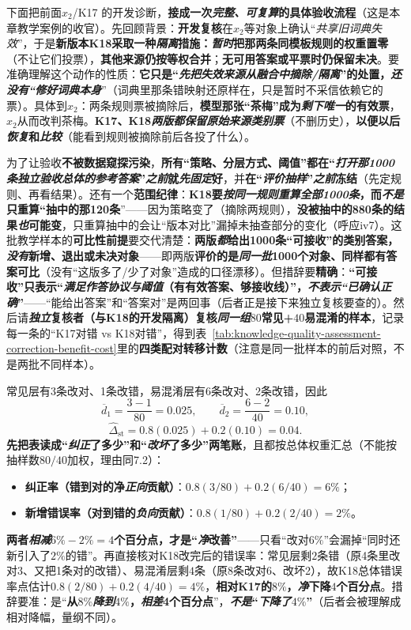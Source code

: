 下面把前面$x_2$/K17 的开发诊断，\textbf{接成一次\emph{完整、可复算}的具体验收流程}（这是本章教学案例的收官）。先回顾背景：\textbf{开发复核}在$x_2$等对象上确认“\emph{共享旧词典失效}”，于是\textbf{新版本K18采取一种\emph{隔离}措施：\emph{暂时}把那两条同模板规则的权重置零}（不让它们投票），\textbf{其他来源仍按等权合并}；\textbf{无可用答案或平票时仍保留未决}。要准确理解这个动作的性质：\textbf{它只是“\emph{先把\emph{失效来源}从融合中\emph{摘除/隔离}}”的处置，\emph{还\emph{没有}“修好词典本身}}”（词典里那条错映射还原样在，只是暂时不采信依赖它的票）。具体到$x_2$：两条规则票被摘除后，\textbf{模型那张“茶梅”成为\emph{剩下唯一}的有效票}，$x_2$从而改判茶梅。\textbf{K17、K18\emph{两版都保留原始来源类别票}}（不删历史），\textbf{以便以后\emph{恢复}和\emph{比较}}（能看到规则被摘除前后各投了什么）。

为了让验收\textbf{不被数据窥探污染}，\textbf{所有“策略、分层方式、阈值”都在“\emph{打开那1000条独立验收总体的参考答案}”\emph{之前}就\emph{先固定}好}，并\textbf{在“\emph{评价抽样}”\emph{之前}冻结}（先定规则、再看结果）。还有一个\textbf{范围纪律}：\textbf{K18要\emph{按同一规则\emph{重算\emph{全部}1000条}}，而\emph{不是}只重算“抽中的那120条}”——因为策略变了（摘除两规则），\textbf{没被抽中的880条的结果\emph{也}可能变}，只重算抽中的会让“版本对比”漏掉未抽查部分的变化（呼应iv7）。这批教学样本的\textbf{可比性前提}要交代清楚：\textbf{两版\emph{都}给出1000条“可接收”的类别答案，\emph{没有}新增、退出或未决对象}——即两版\textbf{评价的是\emph{同一批}1000个对象、同样都有答案可比}（没有“这版多了/少了对象”造成的口径漂移）。但措辞要\textbf{精确}：\textbf{“可接收”只表示“\emph{满足作答协议与阈值}（有有效答案、够接收线）”，\emph{\emph{不}表示“已\emph{确认正确}}”}——“能给出答案”和“答案对”是两回事（后者正是接下来独立复核要查的）。然后请\textbf{\emph{独立}复核者（与K18的开发隔离）复核\emph{同一组}$80$常见+$40$易混淆的样本}，记录每一条的“K17对错 vs K18对错”，得到表~\ref{tab:knowledge-quality-assessment-correction-benefit-cost}里的\textbf{四类配对转移计数}（注意是同一批样本的前后对照，不是两批不同样本）。

常见层有3条改对、1条改错，易混淆层有6条改对、2条改错，因此
\[
  \overline d_1=\frac{3-1}{80}=0.025,\qquad
  \overline d_2=\frac{6-2}{40}=0.10,
\]
\[
  \widehat\Delta_{\mathrm{st}}=0.8(0.025)+0.2(0.10)=0.04.
\]
\textbf{先把表读成“\emph{纠正}了多少”和“\emph{改坏}了多少”两笔账}，且都按总体权重汇总（不能按抽样数$80/40$加权，理由同7.2）：
\begin{itemize}\item \textbf{纠正率（错到对的净\emph{正向}贡献）}：$0.8(3/80)+0.2(6/40)=6\%$；\item \textbf{新增错误率（对到错的\emph{负向}贡献）}：$0.8(1/80)+0.2(2/40)=2\%$。\end{itemize}
\textbf{两者\emph{相减}$6\%-2\%=4$个百分点，才是“\emph{净}改善”}——只看“改对$6\%$”会漏掉“同时还新引入了$2\%$的错”。再直接核对K18改完后的错误率：常见层剩$2$条错（原4条里改对3、又把1条对的改错）、易混淆层剩$4$条（原8条改对6、改坏2），故K18总体错误率点估计$0.8(2/80)+0.2(4/40)=4\%$，\textbf{相对K17的$8\%$，\emph{净}下降$4$个百分点}。措辞要准：是“\textbf{从$8\%$\emph{降到}$4\%$，\emph{相差}4个百分点}”，\textbf{\emph{不是}“\emph{下降了}$4\%$”}（后者会被理解成相对降幅，量纲不同）。

